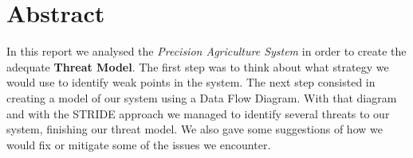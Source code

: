 \section{Abstract}

In this report we analysed the \emph{Precision Agriculture System} in order to create the adequate \textbf{Threat Model}. The first step was to think about what strategy we would use to identify weak points in the system. The next step consisted in creating a model of our system using a Data Flow Diagram. With that diagram and with the STRIDE approach we managed to identify several threats to our system, finishing our threat model. We also gave some suggestions of how we would fix or mitigate some of the issues we encounter.

\pagebreak